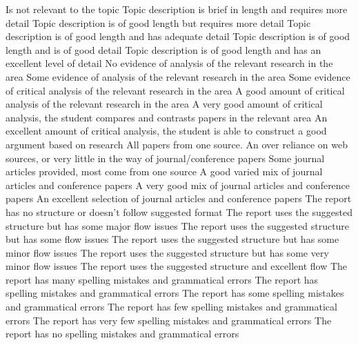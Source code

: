 \documentclass{../../fal_assignment}
\begin{document}
	\begin{markingrubric}
		\grade\fail Is not relevant to the topic
		\grade Topic description is brief in length and requires more detail 
		\grade Topic description is of good length but requires more detail
		\grade Topic description is of good length and has adequate detail 
		\grade Topic description is of good length and is of good detail
		\grade Topic description is of good length and has an excellent level of detail
		\grade\fail No evidence of analysis of the relevant research in the area
		\grade Some evidence of analysis of the relevant research in the area
		\grade Some evidence of critical analysis of the relevant research in the area
		\grade A good amount of critical analysis of the relevant research in the area
		\grade A very good amount of critical analysis, the student compares and contrasts papers in the relevant area
		\grade An excellent amount of critical analysis, the student is able to construct a good argument based on research
		\grade\fail All papers from one source.
		\grade An over reliance on web sources, or very little in the way of journal/conference papers 
		\grade Some journal articles provided, most come from one source
		\grade A good varied mix of journal articles and conference papers
		\grade A very good mix of journal articles and conference papers
		\grade An excellent selection of journal articles and conference papers
		\grade\fail The report has no structure or doesn't follow suggested format
		\grade The report uses the suggested structure but has some major flow issues
		\grade The report uses the suggested structure but has some flow issues
		\grade The report uses the suggested structure but has some minor flow issues
		\grade The report uses the suggested structure but has some very minor flow issues
		\grade The report uses the suggested structure and excellent flow
		\grade\fail The report has many spelling mistakes and grammatical errors	
		\grade The report has spelling mistakes and grammatical errors	
		\grade The report has some spelling mistakes and grammatical errors	
		\grade The report has few spelling mistakes and grammatical errors	
		\grade The report has very few spelling mistakes and grammatical errors	
		\grade The report has no spelling mistakes and grammatical errors	
		
	\end{markingrubric}
	
\end{document}
